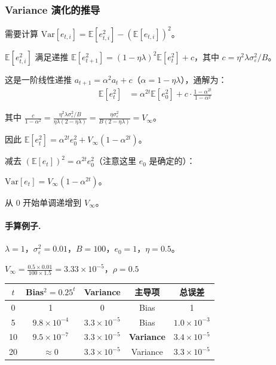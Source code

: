 \documentclass[12pt, a4paper]{ctexart}
\begin{document}
\subsubsection{Variance 演化的推导}

需要计算 $\text{Var}[e_{t,i}] = \mathbb{E}[e_{t,i}^2] - (\mathbb{E}[e_{t,i}])^2$。

$\mathbb{E}[e_{t,i}^2]$ 满足递推 $\mathbb{E}[e_{t+1}^2] = (1-\eta\lambda)^2 \mathbb{E}[e_t^2] + c$，其中 $c = \eta^2\lambda\sigma_\varepsilon^2/B$。

这是一阶线性递推 $a_{t+1} = \alpha^2 a_t + c$（$\alpha = 1-\eta\lambda$），通解为：
\begin{align}
    \mathbb{E}[e_t^2] &= \alpha^{2t} \mathbb{E}[e_0^2] + c \cdot \frac{1-\alpha^{2t}}{1-\alpha^2}
\end{align}

其中 $\frac{c}{1-\alpha^2} = \frac{\eta^2\lambda\sigma_\varepsilon^2/B}{\eta\lambda(2-\eta\lambda)} = \frac{\eta\sigma_\varepsilon^2}{B(2-\eta\lambda)} = V_{\infty}$。

因此 $\mathbb{E}[e_t^2] = \alpha^{2t} e_0^2 + V_\infty(1-\alpha^{2t})$。

减去 $(\mathbb{E}[e_t])^2 = \alpha^{2t} e_0^2$（注意这里 $e_0$ 是确定的）：

$\text{Var}[e_t] = V_\infty(1-\alpha^{2t})$。

从 0 开始单调递增到 $V_\infty$。

\paragraph{手算例子.} $\lambda = 1$，$\sigma_\varepsilon^2 = 0.01$，$B = 100$，$e_0 = 1$，$\eta = 0.5$。

$V_\infty = \frac{0.5 \times 0.01}{100 \times 1.5} = 3.33 \times 10^{-5}$，$\rho = 0.5$

\begin{center}
\begin{tabular}{c|ccc|c}
$t$ & Bias$^2 = 0.25^t$ & Variance & 主导项 & 总误差 \\
\hline
0 & 1 & 0 & Bias & 1 \\
5 & $9.8 \times 10^{-4}$ & $3.3 \times 10^{-5}$ & Bias & $1.0 \times 10^{-3}$ \\
10 & $9.5 \times 10^{-7}$ & $3.3 \times 10^{-5}$ & \textbf{Variance} & $3.4 \times 10^{-5}$ \\
20 & $\approx 0$ & $3.3 \times 10^{-5}$ & Variance & $3.3 \times 10^{-5}$ \\
\end{tabular}
\end{center}
\end{document}
